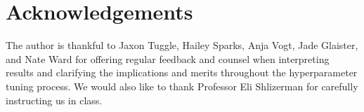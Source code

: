 \documentclass[11pt]{amsart}
\begin{document}
\section*{Acknowledgements}
The author is thankful to Jaxon Tuggle, Hailey Sparks, Anja Vogt, Jade Glaister, and Nate Ward for offering regular feedback and counsel when interpreting results and clarifying the implications and merits throughout the hyperparameter tuning process.
We would also like to thank Professor Eli Shlizerman for carefully instructing us in class.


\end{document}
